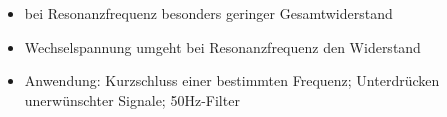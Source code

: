 \begin{frame}
\begin{columns}
\begin{center}
\begin{figure}
      \end{figure}
    \end{center}
  \end{columns}
  \pause
  \begin{itemize}
    \item bei Resonanzfrequenz besonders geringer Gesamtwiderstand
    \item Wechselspannung umgeht bei Resonanzfrequenz den Widerstand
    \item Anwendung: Kurzschluss einer bestimmten Frequenz; Unterdrücken unerwünschter Signale; 50Hz-Filter
  \end{itemize}
\end{frame}


